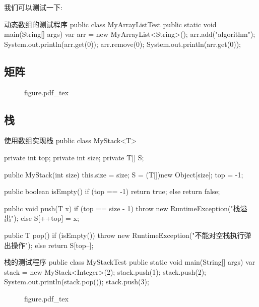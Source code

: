 \documentclass[oneside,10pt,fontset=none]{ctexbook}
\numberwithin{definition}{chapter}
\numberwithin{theorem}{chapter}
\numberwithin{lemma}{chapter}
\begin{document}
我们可以测试一下:

\begin{myjava}{}{动态数组的测试程序}{}
public class MyArrayListTest {
    public static void main(String[] args) {
        var arr = new MyArrayList<String>();
        arr.add("algorithm");
        System.out.println(arr.get(0));
        arr.remove(0);
        System.out.println(arr.get(0));
    }
}
\end{myjava}

\subsection{矩阵}

\begin{figure}[htbp]
    \def\svgwidth{\columnwidth}
    {figure.pdf_tex}
\end{figure}

\subsection{栈}

\begin{myjava}{}{使用数组实现栈}{}
public class MyStack<T> {
    private int top;
    private int size;
    private T[] S;

    public MyStack(int size) {
        this.size = size;
        S = (T[])new Object[size];
        top = -1;
    }

    public boolean isEmpty() {
        if (top == -1) return true;
        else return false;
    }

    public void push(T x) {
        if (top == size - 1)
            throw new RuntimeException("栈溢出");
        else {
            S[++top] = x;
        }
    }

    public T pop() {
        if (isEmpty())
            throw new RuntimeException("不能对空栈执行弹出操作");
        else {
            return S[top--];
        }
    }
}
\end{myjava}

\begin{myjava}{}{栈的测试程序}{}
public class MyStackTest {
    public static void main(String[] args) {
        var stack = new MyStack<Integer>(2);
        stack.push(1);
        stack.push(2);
        System.out.println(stack.pop());
        stack.push(3);
    }
}
\end{myjava}

\begin{figure}[htbp]
    \def\svgwidth{\columnwidth}
    {figure.pdf_tex}
\end{figure}
\end{document}
